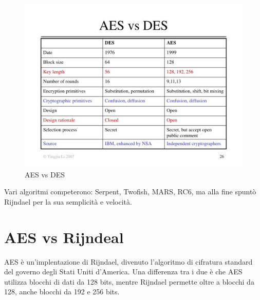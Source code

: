 \begin{figure}[H]
	\centering
	\includegraphics[width=1\textwidth, height=1\textheight, keepaspectratio]{./images/des_vs_aes/aes-vs-des.png}
	\caption{AES vs DES}
	\label{fig:aes_vs_des}
\end{figure}

    

\textsf{\small Vari algoritmi competerono: Serpent, Twofish, MARS, RC6, ma alla fine spuntò Rijndael per la sua semplicità e velocità.} %



\section{AES vs Rijndeal}

 

\textsf{\small AES è un'implentazione di Rijndael, divenuto l'algoritmo di cifratura standard del governo degli Stati Uniti d'America.}
\textsf{\small Una differenza tra i due è che AES utilizza blocchi di dati da 128 bits, mentre Rijndael permette oltre a blocchi da 128, anche blocchi da 192 e 256 bits.} %

 

